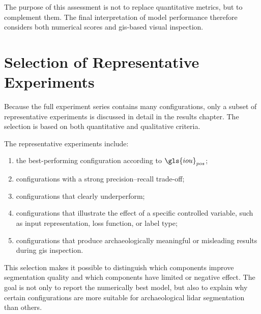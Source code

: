 The purpose of this assessment is not to replace quantitative metrics, but to complement them. The final interpretation of model performance therefore considers both numerical scores and \gls{gis}-based visual inspection.

\section{Selection of Representative Experiments}

Because the full experiment series contains many configurations, only a subset of representative experiments is discussed in detail in the results chapter. The selection is based on both quantitative and qualitative criteria.

The representative experiments include:
\begin{enumerate}
    \item the best-performing configuration according to $\gls{iou}_{pos}$;
    \item configurations with a strong precision--recall trade-off;
    \item configurations that clearly underperform;
    \item configurations that illustrate the effect of a specific controlled variable, such as input representation, loss function, or label type;
    \item configurations that produce archaeologically meaningful or misleading results during \gls{gis} inspection.
\end{enumerate}

This selection makes it possible to distinguish which components improve segmentation quality and which components have limited or negative effect. The goal is not only to report the numerically best model, but also to explain why certain configurations are more suitable for archaeological \gls{lidar} segmentation than others.
